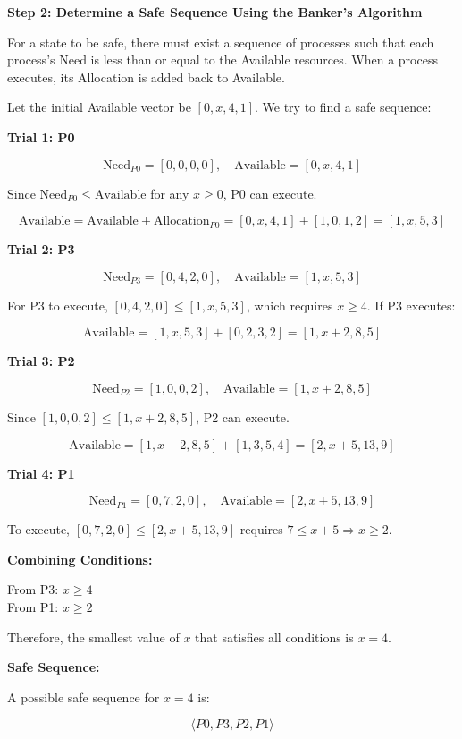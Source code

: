 \documentclass[../main.tex]{subfiles}
\begin{document}
\medskip

\textbf{Step 2: Determine a Safe Sequence Using the Banker's Algorithm}  

For a state to be safe, there must exist a sequence of processes such that each process's Need is less than or equal to the Available resources. When a process executes, its Allocation is added back to Available.  

Let the initial Available vector be $[0, x, 4, 1]$. We try to find a safe sequence:

\medskip
\textbf{Trial 1: P0}  

\[
\text{Need}_{P0} = [0,0,0,0], \quad \text{Available} = [0, x, 4, 1]
\]

Since $\text{Need}_{P0} \le \text{Available}$ for any $x \ge 0$, P0 can execute.  

\[
\text{Available} = \text{Available} + \text{Allocation}_{P0} = [0,x,4,1] + [1,0,1,2] = [1,x,5,3]
\]

\medskip
\textbf{Trial 2: P3}  

\[
\text{Need}_{P3} = [0,4,2,0], \quad \text{Available} = [1,x,5,3]
\]

For P3 to execute, $[0,4,2,0] \le [1,x,5,3]$, which requires $x \ge 4$. If P3 executes:

\[
\text{Available} = [1,x,5,3] + [0,2,3,2] = [1,x+2,8,5]
\]

\medskip
\textbf{Trial 3: P2}  

\[
\text{Need}_{P2} = [1,0,0,2], \quad \text{Available} = [1,x+2,8,5]
\]

Since $[1,0,0,2] \le [1,x+2,8,5]$, P2 can execute.  

\[
\text{Available} = [1,x+2,8,5] + [1,3,5,4] = [2,x+5,13,9]
\]

\medskip
\textbf{Trial 4: P1}  

\[
\text{Need}_{P1} = [0,7,2,0], \quad \text{Available} = [2,x+5,13,9]
\]

To execute, $[0,7,2,0] \le [2,x+5,13,9]$ requires $7 \le x+5 \Rightarrow x \ge 2$.  

\medskip
\textbf{Combining Conditions:}  

From P3: $x \ge 4$ \\
From P1: $x \ge 2$  

\noindent Therefore, the smallest value of $x$ that satisfies all conditions is $x = 4$.  

\medskip
\textbf{Safe Sequence:}  

A possible safe sequence for $x=4$ is:

\[
\langle P0, P3, P2, P1 \rangle
\]
\end{document}
